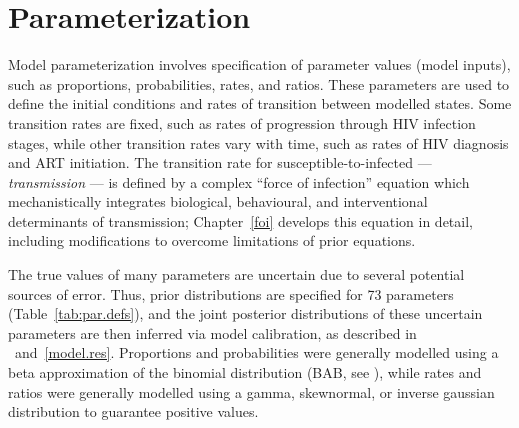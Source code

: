 \section{Parameterization}\label{model.par}
Model parameterization involves specification of parameter values (model inputs),
such as proportions, probabilities, rates, and ratios.
These parameters are used to define
the initial conditions and rates of transition between modelled states.
Some transition rates are fixed, such as rates of progression through HIV infection stages,
while other transition rates vary with time, such as rates of HIV diagnosis and ART initiation.
The transition rate for susceptible-to-infected --- \ie \emph{transmission} ---
is defined by a complex ``force of infection'' equation which mechanistically integrates
biological, behavioural, and interventional determinants of transmission;
Chapter~\ref{foi} develops this equation in detail,
including modifications to overcome limitations of prior equations.
\par
The true values of many parameters are uncertain due to several potential sources of error.
Thus, prior distributions are specified for 73 parameters (Table~\ref{tab:par.defs}),
and the joint posterior distributions of these uncertain parameters are then inferred
via model calibration, as described in ~and~\ref{model.res}.
Proportions and probabilities were generally modelled using
a beta approximation of the binomial distribution (BAB, see ),
while rates and ratios were generally modelled using
a gamma, skewnormal, or inverse gaussian distribution to guarantee positive values.











